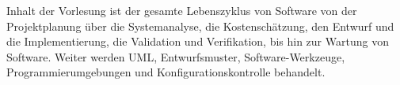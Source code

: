 \begin{module}
\begin{content}
Inhalt der Vorlesung ist der gesamte Lebenszyklus von Software von der Projektplanung über die Systemanalyse, die Kostenschätzung, den Entwurf und die Implementierung, die Validation und Verifikation, bis hin zur Wartung von Software. Weiter werden UML, Entwurfsmuster, Software-Werkzeuge, Programmierumgebungen und Konfigurationskontrolle behandelt.


\end{content}



\end{module}

